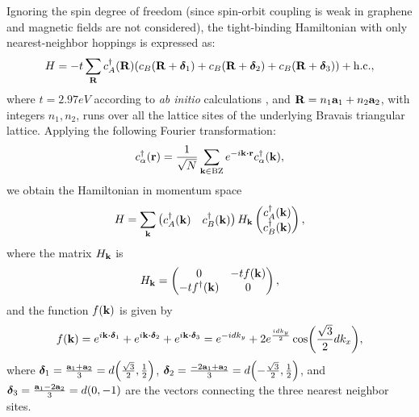 Ignoring the spin degree of freedom (since spin-orbit coupling is weak in graphene and magnetic fields are not considered), the tight-binding Hamiltonian with only nearest-neighbor hoppings is expressed as:
\begin{equation} \label{eq:monolayer-tight-binding}
H = -t \sum_{{\vb{R}}} c^{\dagger}_A({\vb{R}}) \qty(c_B({\vb{R}} + {\bm{\delta}}_1) + c_B({\vb{R}}+{\bm{\delta}}_2) + c_B({\vb{R}}+{\bm{\delta}}_3)) + {\text{h.c.}},
\end{equation}
where $t = 2.97 \unit{eV}$ according to \textit{ab initio} calculations \cite{handbook2019}, and \({\vb{R}} = n_1 {\vb{a}}_1 + n_2 {\vb{a}}_2\), with integers \(n_1, n_2\), runs over all the lattice sites of the underlying Bravais triangular lattice. Applying the following Fourier transformation:
\begin{equation} \label{eq:monolayer-fourier}
c_{\alpha}^\d(\r) = \frac{1}{\sqrt{N}} \sum_{\k \in \text{BZ}} e^{-i \k \vdot \r} c_\alpha^\d(\k),
\end{equation}
we obtain the Hamiltonian in momentum space
\begin{equation} \label{eq:monolayer-tight-binding2}
H = \sum_{{\vb{k}}}
\begin{pmatrix}
c_A^{\dagger}({\vb{k}}) & c_B^{\dagger}({\vb{k}})
\end{pmatrix}
H_{\vb{k}}
\begin{pmatrix}
c_A^{\dagger}({\vb{k}}) \\ c_B^{\dagger}({\vb{k}})
\end{pmatrix},
\end{equation}
where the matrix \(H_{\vb{k}}\) is
\begin{equation} \label{eq:hamiltonian_k_monolayer}
H_{\vb{k}} =
\begin{pmatrix}
0 & -t f({\vb{k}}) \\
-t f^{\dagger}({\vb{k}}) & 0
\end{pmatrix},
\end{equation}
and the function \(f({\vb{k}})\) is given by
\begin{equation} \label{eq:monolayer-fk}
f(\k) = e^{i \k \vdot \bm{\delta}_1} + e^{i \k \vdot \bm{\delta}_2} + e^{i \k \vdot \bm{\delta}_3} =
e^{-idk_y} + 2 e^{\frac{idk_y}{2}} \cos(\frac{\sqrt{3}}{2} dk_x),
\end{equation}
where \(\bm{\delta}_1 = \frac{{\vb{a}}_1 + {\vb{a}}_2}{3} = d \qty(\frac{\sqrt{3}}{2}, \frac{1}{2})\), \(\bm{\delta}_2 = \frac{-2 {\vb{a}}_1 + {\vb{a}}_2}{3} = d \qty(-\frac{\sqrt{3}}{2}, \frac{1}{2})\), and \(\bm{\delta}_3 = \frac{{\vb{a}}_1 - 2 {\vb{a}}_2}{3} = d \qty(0, -1)\) are the vectors connecting the three nearest neighbor sites.

